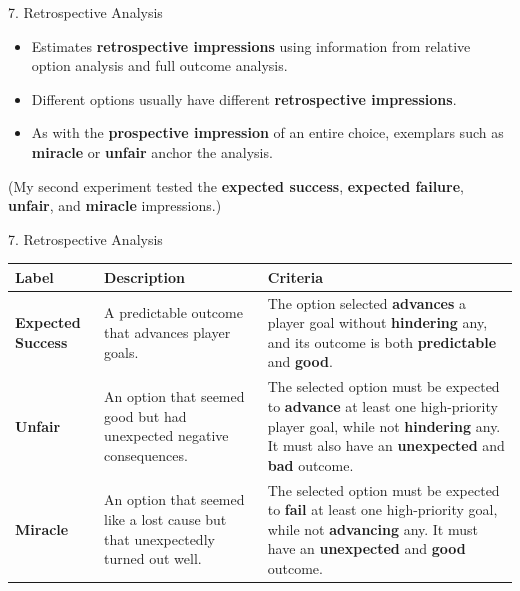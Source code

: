 \documentclass[xcolor=x11names]{beamer}
\begin{document}
\begin{frame}{7. Retrospective Analysis}
  \begin{itemize}\addtolength{\itemsep}{0.5\baselineskip}
    \item Estimates \textbf{retrospective impressions} using information from relative option analysis and full outcome analysis.
    \item Different options usually have different \textbf{retrospective impressions}.
    \item As with the \textbf{prospective impression} of an entire choice, exemplars such as \textbf{miracle} or \textbf{unfair} anchor the analysis.
  \end{itemize}
  \vfill
  \centering
  \scriptsize (My second experiment tested the \textbf{expected success}, \textbf{expected failure}, \textbf{unfair}, and \textbf{miracle} impressions.)
\end{frame}

\begin{frame}{7. Retrospective Analysis}
\centering
\renewcommand*{\arraystretch}{1.5}
\footnotesize
\hspace*{-1.5em}
\begin{tabular}{p{4.5em}p{12em}p{16.5em}}
\toprule
\textbf{Label} & \textbf{Description} & \textbf{Criteria} \\
\midrule
\textbf{Expected Success} & A predictable outcome that advances player goals. & The option selected \textbf{advances} a player goal without \textbf{hindering} any, and its outcome is both \textbf{predictable} and \textbf{good}. \\
\textbf{Unfair} & An option that seemed good but had unexpected negative consequences. & The selected option must be expected to \textbf{advance} at least one high-priority player goal, while not \textbf{hindering} any. It must also have an \textbf{unexpected} and \textbf{bad} outcome. \\
\textbf{Miracle} & An option that seemed like a lost cause but that unexpectedly turned out well. & The selected option must be expected to \textbf{fail} at least one high-priority goal, while not \textbf{advancing} any. It must have an \textbf{unexpected} and \textbf{good} outcome. \\
\bottomrule
\end{tabular}
\end{frame}
\end{document}
